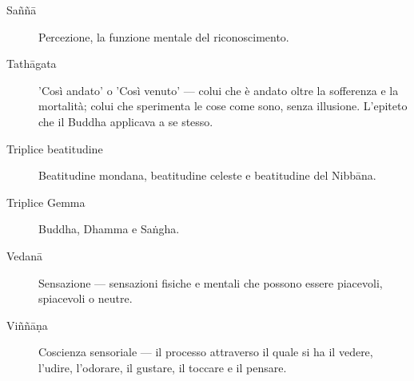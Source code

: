 \begin{description}
\item[Saññā] Percezione, la funzione mentale del riconoscimento.

\item[Tathāgata] 'Così andato' o 'Così venuto' --- colui che è andato oltre
  la sofferenza e la mortalità; colui che sperimenta le cose come sono,
  senza illusione. L'epiteto che il Buddha applicava a se stesso.

\item[Triplice beatitudine] Beatitudine mondana, beatitudine celeste e beatitudine
  del Nibbāna.

\item[Triplice Gemma] Buddha, Dhamma e Saṅgha.

\item[Vedanā] Sensazione --- sensazioni fisiche e mentali che possono essere
  piacevoli, spiacevoli o neutre.

\item[Viññāṇa] Coscienza sensoriale --- il processo attraverso il quale si ha
  il vedere, l'udire, l'odorare, il gustare, il toccare e il pensare.

\end{description}
